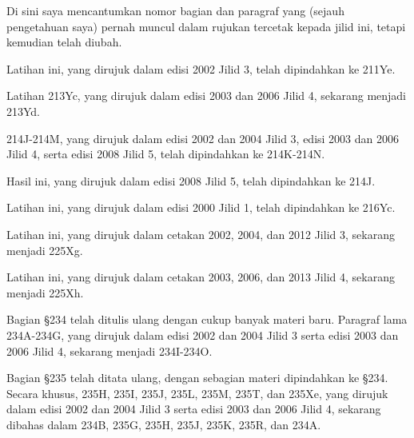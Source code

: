 \ifresultsonly\else
{}

\gdef\topparagraph{}
\gdef\bottomparagraph{}
\gdef\newparagraph{}

\def\chaptername{Konkordansi}
\def\sectionname{Konkordansi}

\newsection{}

Di sini saya mencantumkan nomor bagian dan paragraf yang (sejauh pengetahuan
saya) pernah muncul dalam rujukan tercetak kepada jilid ini, tetapi kemudian
telah diubah.

\medskip

Latihan ini, yang dirujuk dalam edisi 2002 Jilid 3, telah dipindahkan ke
211Ye.

 Latihan 2{}13Yc, yang dirujuk dalam edisi
2003 dan 2006 Jilid 4, sekarang menjadi 213Yd.   %

2{}14J-2{}14M, yang dirujuk dalam edisi 2002 dan 2004 Jilid 3, edisi 2003
dan 2006 Jilid 4, serta edisi 2008 Jilid 5, telah dipindahkan ke
214K-214N.  %

 Hasil ini, yang dirujuk dalam
edisi 2008 Jilid 5, telah dipindahkan ke 214J.

 Latihan ini, yang dirujuk dalam edisi
2000 Jilid 1, telah dipindahkan ke 216Yc.

 Latihan ini, yang dirujuk dalam
cetakan 2002, 2004, dan 2012 Jilid 3, sekarang menjadi 225Xg.

 Latihan ini, yang dirujuk dalam
cetakan 2003, 2006, dan 2013 Jilid 4, sekarang menjadi 225Xh.

 Bagian \S2{}34 telah ditulis ulang dengan cukup banyak
materi baru. Paragraf lama 2{}34A-2{}34G, yang dirujuk dalam edisi 2002 dan
2004 Jilid 3 serta edisi 2003 dan 2006 Jilid 4, sekarang menjadi 234I-234O.

 Bagian \S2{}35 telah ditata ulang, dengan sebagian
materi dipindahkan ke \S2{}34. Secara khusus, 2{}35H, 2{}35I, 2{}35J,
2{}35L, 2{}35M, 2{}35T, dan 2{}35Xe, yang dirujuk dalam edisi 2002 dan 2004
Jilid 3 serta edisi 2003 dan 2006 Jilid 4, sekarang dibahas dalam
234B, 235G, 235H, 235J, 235K, 235R, dan 234A.

